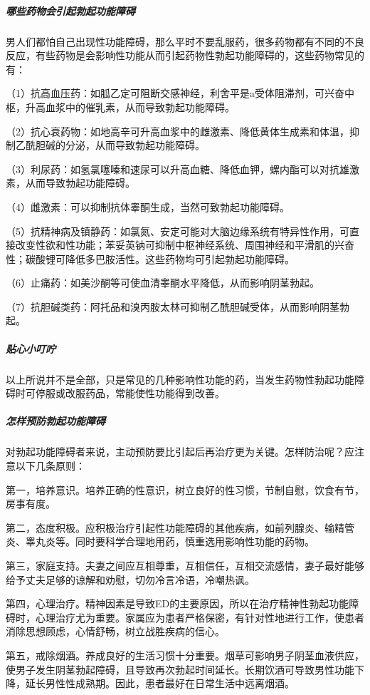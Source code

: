 \subparagraph{哪些药物会引起勃起功能障碍}

男人们都怕自己出现性功能障碍，那么平时不要乱服药，很多药物都有不同的不良反应，有些药物是会影响性功能从而引起药物性勃起功能障碍的，这些药物常见的有：

（1）抗高血压药：如胍乙定可阻断交感神经，利舍平是a受体阻滞剂，可兴奋中枢，升高血浆中的催乳素，从而导致勃起功能障碍。

（2）抗心衰药物：如地高辛可升高血浆中的雌激素、降低黄体生成素和体温，抑制乙酰胆碱的分泌，从而导致勃起功能障碍。

（3）利尿药：如氢氯噻嗪和速尿可以升高血糖、降低血钾，螺内酯可以对抗雄激素，从而导致勃起功能障碍。

（4）雌激素：可以抑制抗体睾酮生成，当然可致勃起功能障碍。

（5）抗精神病及镇静药：如氯氮、安定可能对大脑边缘系统有特异性作用，可直接改变性欲和性功能；苯妥英钠可抑制中枢神经系统、周围神经和平滑肌的兴奋性；碳酸锂可降低多巴胺活性。这些药物均可引起勃起功能障碍。

（6）止痛药：如美沙酮等可使血清睾酮水平降低，从而影响阴茎勃起。

（7）抗胆碱类药：阿托品和溴丙胺太林可抑制乙酰胆碱受体，从而影响阴茎勃起。

\subparagraph{贴心小叮咛}

以上所说并不是全部，只是常见的几种影响性功能的药，当发生药物性勃起功能障碍时可停服或改服药品，常能使性功能得到改善。

\subparagraph{怎样预防勃起功能障碍}

对勃起功能障碍者来说，主动预防要比引起后再治疗更为关键。怎样防治呢？应注意以下几条原则：

第一，培养意识。培养正确的性意识，树立良好的性习惯，节制自慰，饮食有节，房事有度。

第二，态度积极。应积极治疗引起性功能障碍的其他疾病，如前列腺炎、输精管炎、睾丸炎等。同时要科学合理地用药，慎重选用影响性功能的药物。

第三，家庭支持。夫妻之间应互相尊重，互相信任，互相交流感情，妻子最好能够给予丈夫足够的谅解和劝慰，切勿冷言冷语，冷嘲热讽。

第四，心理治疗。精神因素是导致ED的主要原因，所以在治疗精神性勃起功能障碍时，心理治疗尤为重要。家属应为患者严格保密，有针对性地进行工作，使患者消除思想顾虑，心情舒畅，树立战胜疾病的信心。

第五，戒除烟酒。养成良好的生活习惯十分重要。烟草可影响男子阴茎血液供应，使男子发生阴茎勃起障碍，且导致再次勃起时间延长。长期饮酒可导致男性功能下降，延长男性性成熟期。因此，患者最好在日常生活中远离烟酒。

